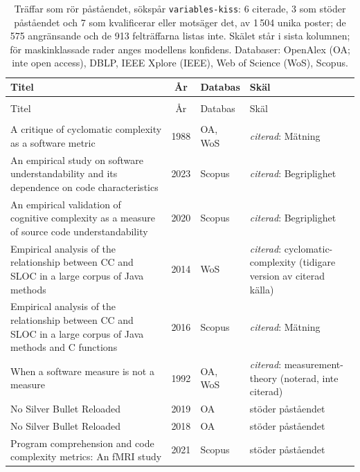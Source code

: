 \begingroup\footnotesize
\begin{longtable}{@{}%
  >{\raggedright\arraybackslash}p{}c%
  >{\raggedright\arraybackslash}p{}%
  >{\raggedright\arraybackslash}p{}@{}}
\caption{Träffar som rör påståendet, sökspår \texttt{variables-kiss}: 6 citerade, 3 som stöder påståendet och 7 som kvalificerar eller motsäger det, av 1\,504 unika poster; de 575 angränsande och de 913 felträffarna listas inte.  Skälet står i sista kolumnen; för maskinklassade rader anges modellens konfidens.  Databaser: OpenAlex (OA; inte \foreignlanguage{english}{open access}), DBLP, IEEE Xplore (IEEE), Web of Science (WoS), Scopus.}\label{tab:kiss}\\
\toprule
Titel & År & Databas & Skäl \\
\midrule
\endfirsthead
\multicolumn{4}{@{}l}{\emph{\tablename~\thetable{} (forts.)}}\\
\toprule Titel & År & Databas & Skäl \\ \midrule
\endhead
\midrule \multicolumn{4}{r@{}}{\emph{forts.\ på nästa sida}}\\
\endfoot
\bottomrule
\endlastfoot
A critique of cyclomatic complexity as a software metric & 1988 & OA, WoS & \emph{citerad}: Mätning \\
An empirical study on software understandability and its dependence on code characteristics & 2023 & Scopus & \emph{citerad}: Begriplighet \\
An empirical validation of cognitive complexity as a measure of source code understandability & 2020 & Scopus & \emph{citerad}: Begriplighet \\
Empirical analysis of the relationship between CC and SLOC in a large corpus of Java methods & 2014 & WoS & \emph{citerad}: cyclomatic-complexity (tidigare version av citerad källa) \\
Empirical analysis of the relationship between CC and SLOC in a large corpus of Java methods and C functions & 2016 & Scopus & \emph{citerad}: Mätning \\
When a software measure is not a measure & 1992 & OA, WoS & \emph{citerad}: measurement-theory (noterad, inte citerad) \\
No Silver Bullet Reloaded & 2019 & OA & stöder påståendet \\
No Silver Bullet Reloaded & 2018 & OA & stöder påståendet \\
Program comprehension and code complexity metrics: An fMRI study & 2021 & Scopus & stöder påståendet \\

\end{longtable}
